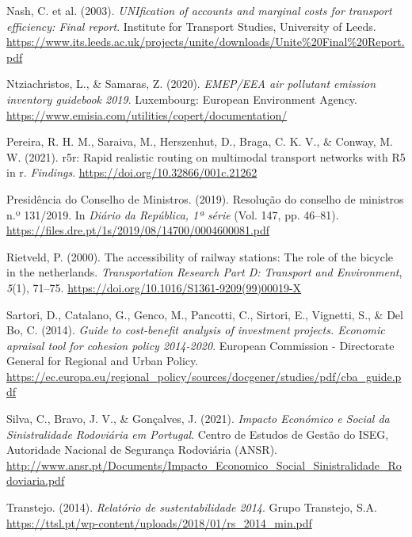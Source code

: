 \documentclass[review, doubleblind, 3p,
authoryear]{elsarticle} %
\newlength{\cslhangindent}
\newlength{\cslentryspacingunit} %
\newenvironment{CSLReferences}[2] %
 {%
  \setlength{\parindent}{0pt}
  \ifodd #1
  \let\oldpar\par
  \def\par{\hangindent=\cslhangindent\oldpar}
  \fi
  \setlength{\parskip}{#2\cslentryspacingunit}
 }%
 {}
\begin{document}
\begin{CSLReferences}{1}{0}
\leavevmode{}%
Nash, C. et al. (2003). \emph{UNIfication of accounts and marginal costs
for transport efficiency: Final report}. {Institute for Transport
Studies, University of Leeds}.
\url{https://www.its.leeds.ac.uk/projects/unite/downloads/Unite\%20Final\%20Report.pdf}

\leavevmode{}%
Ntziachristos, L., \& Samaras, Z. (2020). \emph{{EMEP/EEA} air pollutant
emission inventory guidebook 2019}. Luxembourg: European Environment
Agency. \url{https://www.emisia.com/utilities/copert/documentation/}

\leavevmode{}%
Pereira, R. H. M., Saraiva, M., Herszenhut, D., Braga, C. K. V., \&
Conway, M. W. (2021). r5r: Rapid realistic routing on multimodal
transport networks with R5 in r. \emph{Findings}.
\url{https://doi.org/10.32866/001c.21262}

\leavevmode{}%
Presidência do Conselho de Ministros. (2019). Resolução do conselho de
ministros n.º 131/2019. In \emph{Diário da República, 1ª série} (Vol.
147, pp. 46--81).
\url{https://files.dre.pt/1s/2019/08/14700/0004600081.pdf}

\leavevmode{}%
Rietveld, P. (2000). The accessibility of railway stations: The role of
the bicycle in the netherlands. \emph{Transportation Research Part D:
Transport and Environment}, \emph{5}(1), 71--75.
\url{https://doi.org/10.1016/S1361-9209(99)00019-X}

\leavevmode{}%
Sartori, D., Catalano, G., Genco, M., Pancotti, C., Sirtori, E.,
Vignetti, S., \& Del Bo, C. (2014). \emph{Guide to cost-benefit analysis
of investment projects. Economic apraisal tool for cohesion policy
2014-2020}. {European Commission - Directorate General for Regional and
Urban Policy}.
\url{https://ec.europa.eu/regional_policy/sources/docgener/studies/pdf/cba_guide.pdf}

\leavevmode{}%
Silva, C., Bravo, J. V., \& Gonçalves, J. (2021). \emph{{Impacto
Económico e Social da Sinistralidade Rodoviária em Portugal}}. {Centro
de Estudos de Gestão do ISEG, Autoridade Nacional de Segurança
Rodoviária (ANSR)}.
\url{http://www.ansr.pt/Documents/Impacto_Economico_Social_Sinistralidade_Rodoviaria.pdf}

\leavevmode{}%
Transtejo. (2014). \emph{Relatório de sustentabilidade 2014}. {Grupo
Transtejo, S.A.}
\url{https://ttsl.pt/wp-content/uploads/2018/01/rs_2014_min.pdf}

\end{CSLReferences}
\end{document}
